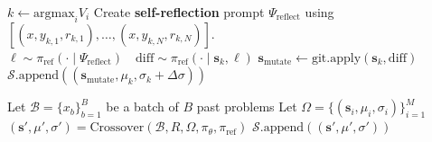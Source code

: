 \documentclass{article}
\theoremstyle{plain}
\theoremstyle{definition}
\theoremstyle{remark}
\begin{document}
\begin{algorithm}[t]
\begin{algorithmic}
    \STATE $k\leftarrow \mathrm{argmax}_{i} V_{i}$ \hfill {}
    \STATE Create {\color{magenta}\textbf{{} self-reflection}} prompt $\Psi_{\text{reflect}}$ using $[(x, y_{k,1}, r_{k,1}), \dots, (x, y_{k,N}, r_{k,N})]$.
    \STATE $\ell \sim \pi_{\text{ref}}(\cdot \mid \Psi_{\text{reflect}}) \quad \mathrm{diff} \sim \pi_{\text{ref}}(\cdot \mid \mathbf{s}_{k}, \ell)$
    \STATE $\mathbf{s}_{\text{mutate}} \leftarrow \mathrm{git}.\mathrm{apply}(\mathbf{s}_{k}, \mathrm{diff})$ \hfill {}
    \STATE $\mathcal{S}.\mathrm{append}((\mathbf{s}_{\text{mutate}}, \mu_{k}, \sigma_{k} + \Delta\sigma))$
    \vspace{5pt}
    
        \STATE Let $\mathcal{B} = \{ x_{b} \}_{b=1}^{B}$ be a batch of $B$ past problems
        \STATE Let $\Omega=\{(\mathbf{s}_{i}, \mu_i, \sigma_i)\}_{i=1}^{M}$
        \STATE $(\mathbf{s}', \mu', \sigma')=\mathrm{Crossover}(\mathcal{B}, R, \Omega, \pi_{\theta}, \pi_{\text{ref}} )$ \hfill  {}
        \STATE $\mathcal{S}.\mathrm{append}((\mathbf{s}', \mu', \sigma'))$
    \ENDIF
    \ENDWHILE
  \end{algorithmic}
\end{algorithm}
\end{document}
